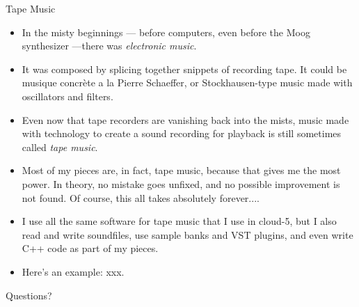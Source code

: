 \documentclass{beamer}
\begin{document}
\begin{frame}{Tape Music}

\begin{itemize}
\item In the misty beginnings --- before computers, even before the Moog synthesizer ---there was \emph{electronic music}.
\item It was composed by splicing together snippets of recording tape. It could be musique concrète a la Pierre Schaeffer, or Stockhausen-type music made with oscillators and filters.
\item Even now that tape recorders are vanishing back into the mists, music made with technology to create a sound recording for playback is still sometimes called \emph{tape music}.
\item Most of my pieces are, in fact, tape music, because that gives me the most power. In theory, no mistake goes unfixed, and no possible improvement is not found. Of course, this all takes absolutely forever....
\item I use all the same software for tape music that I use in cloud-5, but I also read and write soundfiles, use sample banks and VST plugins, and even write C++ code as part of my pieces.
\item Here's an example: xxx.

\end{itemize}


\end{frame}

\begin{frame}{Questions?}

\end{frame}
\end{document}
